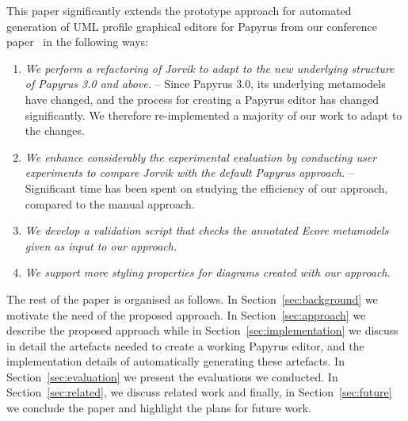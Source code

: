 This paper significantly extends the prototype approach for automated generation of UML profile graphical editors for Papyrus from our conference paper~\cite{zolotas2018towards} in the following ways:
\begin{enumerate}
	\item \textit{We perform a refactoring of Jorvik to adapt to the new underlying structure of Papyrus 3.0 and above.} --
	Since Papyrus 3.0, its underlying metamodels have changed, and the process for creating a Papyrus editor has changed significantly. 
	We therefore re-implemented a majority of our work to adapt to the changes. 
	\item \textit{We enhance considerably the experimental evaluation by conducting user experiments to compare Jorvik with the default Papyrus approach.} --
	Significant time has been spent on studying the efficiency of our approach, compared to the manual approach.
	\item \textit{We develop a validation script that checks the annotated Ecore metamodels given as input to our approach.}
	\item \textit{We support more styling properties for diagrams created with our approach.}
\end{enumerate}
The rest of the paper is organised as follows. 
In Section~\ref{sec:background} we motivate the need of the proposed approach. 
In Section~\ref{sec:approach} we describe the proposed approach while 
in Section~\ref{sec:implementation} we discuss in detail the artefacts needed to create a working Papyrus editor, and the implementation details of automatically generating these artefacts. 
In Section~\ref{sec:evaluation} we present the evaluations we conducted.
In Section~\ref{sec:related}, we discuss related work and finally, in Section~\ref{sec:future} we conclude the paper and highlight the plans for future work.
